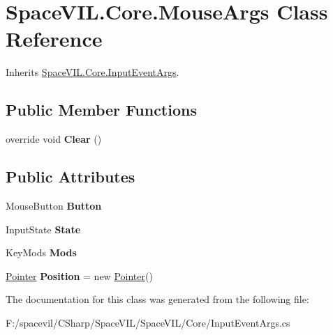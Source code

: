 \hypertarget{class_space_v_i_l_1_1_core_1_1_mouse_args}{}\section{Space\+V\+I\+L.\+Core.\+Mouse\+Args Class Reference}
\label{class_space_v_i_l_1_1_core_1_1_mouse_args}


Inherits \mbox{\hyperlink{class_space_v_i_l_1_1_core_1_1_input_event_args}{Space\+V\+I\+L.\+Core.\+Input\+Event\+Args}}.

\subsection*{Public Member Functions}
\begin{DoxyCompactItemize}
\item 
\mbox{\label{class_space_v_i_l_1_1_core_1_1_mouse_args_a5cfcaa3655f01b0aab43bc6904f37b79}} 
override void {\bfseries Clear} ()
\end{DoxyCompactItemize}
\subsection*{Public Attributes}
\begin{DoxyCompactItemize}
\item 
\mbox{\label{class_space_v_i_l_1_1_core_1_1_mouse_args_af319bfab5c281eb6500b6a9817d58960}} 
Mouse\+Button {\bfseries Button}
\item 
\mbox{\label{class_space_v_i_l_1_1_core_1_1_mouse_args_a3f4854e5ff400b7c9c9db431ccfbae0a}} 
Input\+State {\bfseries State}
\item 
\mbox{\label{class_space_v_i_l_1_1_core_1_1_mouse_args_a581f3c72b6e296a10208fb0965c1be8c}} 
Key\+Mods {\bfseries Mods}
\item 
\mbox{\label{class_space_v_i_l_1_1_core_1_1_mouse_args_aa90d315915d577763e4296448c8b344d}} 
\mbox{\hyperlink{class_space_v_i_l_1_1_core_1_1_pointer}{Pointer}} {\bfseries Position} = new \mbox{\hyperlink{class_space_v_i_l_1_1_core_1_1_pointer}{Pointer}}()
\end{DoxyCompactItemize}


The documentation for this class was generated from the following file\+:\begin{DoxyCompactItemize}
\item 
F\+:/spacevil/\+C\+Sharp/\+Space\+V\+I\+L/\+Space\+V\+I\+L/\+Core/Input\+Event\+Args.\+cs\end{DoxyCompactItemize}
